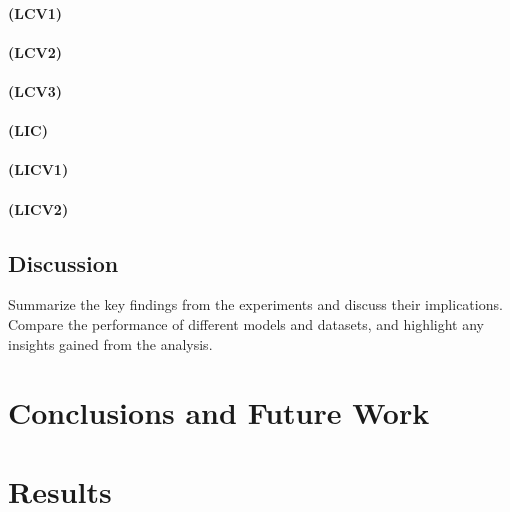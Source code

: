 \documentclass[a4paper, 12pt]{report}
\begin{document}
\subsubsection{(LCV1)}
\subsubsection{(LCV2)}
\subsubsection{(LCV3)}
\subsubsection{(LIC)}
\subsubsection{(LICV1)}
\subsubsection{(LICV2)}

\section{Discussion}

Summarize the key findings from the experiments and discuss their implications. Compare the performance of different models and datasets, and highlight any insights gained from the analysis.

\chapter{Conclusions and Future Work}
\label{ch:Conclusions and Future Work}

\chapter{Results}
\label{ch:Results}


\end{document}
